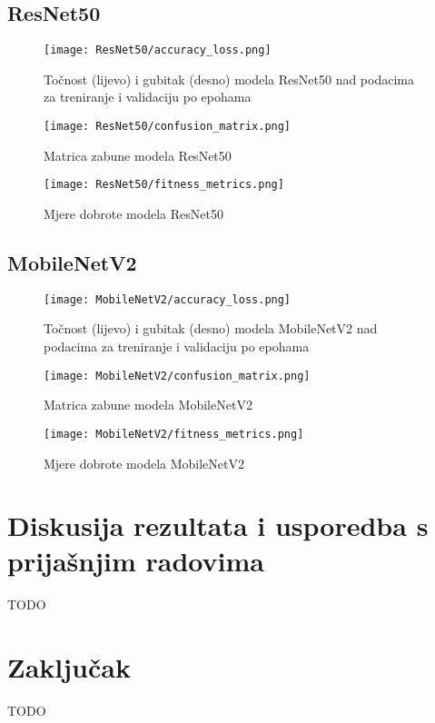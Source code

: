 \documentclass[conference, utf8]{IEEEtran}
\begin{document}
\subsection{ResNet50}
\begin{figure}[ht]
	\centering
	\texttt{[image: ResNet50/accuracy\_loss.png]}
	\caption{Točnost (lijevo) i gubitak (desno) modela ResNet50 nad podacima za treniranje i validaciju po epohama}
	\label{fig:RN50_acc_loss}
\end{figure}
\begin{figure}[ht]
	\centering
	\texttt{[image: ResNet50/confusion\_matrix.png]}
	\caption{Matrica zabune modela ResNet50}
	\label{fig:RN50_conf_mat}
\end{figure}
\begin{figure}[ht]
	\centering
	\texttt{[image: ResNet50/fitness\_metrics.png]}
	\caption{Mjere dobrote modela ResNet50}
	\label{fig:RN50_fit_met}
\end{figure}

\pagebreak

\subsection{MobileNetV2}
\begin{figure}[ht]
  \centering
  \texttt{[image: MobileNetV2/accuracy\_loss.png]}
  \caption{Točnost (lijevo) i gubitak (desno) modela MobileNetV2 nad podacima za treniranje i validaciju po epohama}
  \label{fig:MN_acc_loss}
\end{figure}
\begin{figure}[ht]
  \centering
  \texttt{[image: MobileNetV2/confusion\_matrix.png]}
  \caption{Matrica zabune modela MobileNetV2}
  \label{fig:MN_conf_mat}
\end{figure}
\begin{figure}[ht]
  \centering
  \texttt{[image: MobileNetV2/fitness\_metrics.png]}
  \caption{Mjere dobrote modela MobileNetV2}
  \label{fig:MN_fit_met}
\end{figure}

\pagebreak


\section{Diskusija rezultata i usporedba s prijašnjim radovima}
TODO

\pagebreak

\section{Zaključak}
TODO



\end{document}
